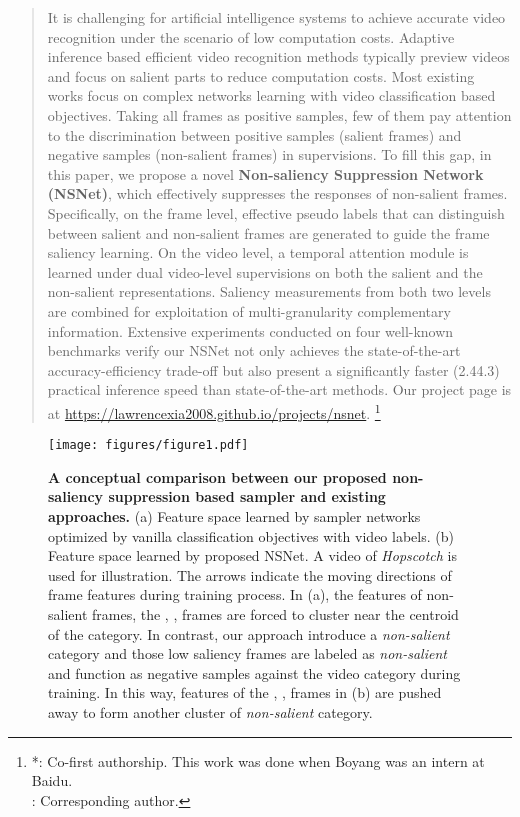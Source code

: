 \documentclass[runningheads]{llncs}
\newcommand\blfootnote[1]{\begingroup
  \renewcommand\thefootnote{}\footnote{#1}\addtocounter{footnote}{-1}\endgroup
}
\begin{document}
\begin{abstract}
It is challenging for artificial intelligence systems to achieve accurate video recognition under the scenario of low computation costs. Adaptive inference based efficient video recognition methods typically preview videos and focus on salient parts to reduce computation costs. 
Most existing works focus on complex networks learning with video classification based objectives. 
Taking all frames as positive samples, few of them pay attention to the discrimination between positive samples (salient frames) and negative samples (non-salient frames) in supervisions. To fill this gap, in this paper, we propose a novel \textbf{Non-saliency Suppression Network (NSNet)}, which 
effectively suppresses the responses of non-salient frames. 
Specifically, on the frame level, effective pseudo labels that can distinguish between salient and non-salient frames are generated to guide the frame saliency learning.
On the video level, a temporal attention module is learned under dual video-level supervisions on both the salient and the non-salient representations. Saliency measurements from both two levels are combined for exploitation of multi-granularity complementary information. Extensive experiments conducted on four well-known benchmarks
verify our NSNet not only achieves the state-of-the-art accuracy-efficiency trade-off but also present a significantly faster (2.44.3) practical inference speed than state-of-the-art methods. Our project page is at \url{https://lawrencexia2008.github.io/projects/nsnet}.
\blfootnote{*: Co-first authorship. This work was done when Boyang was an intern at Baidu. \\ \Letter: Corresponding author.}
\end{abstract}



\begin{figure}[t]
      \centering \texttt{[image: figures/figure1.pdf]}
      \caption{\textbf{A conceptual comparison between our proposed non-saliency suppression based sampler and existing approaches. } (a) Feature space learned by sampler networks 
optimized by vanilla classification objectives with video labels. (b) Feature space learned by proposed NSNet.
       A video of \emph{Hopscotch} is used for illustration. The arrows indicate the moving directions of frame features during training process. In (a),
the features of non-salient frames, the , ,  frames are forced to cluster near the centroid of the category. 
In contrast, our approach introduce a \emph{non-salient} category and those low saliency frames are labeled as \emph{non-salient} and function as negative samples against the video category during training. In this way, features of the , ,  frames in (b) are pushed away to form another cluster of \emph{non-salient} category.
}
      \label{fig:figure1}
\end{figure}
\end{document}
